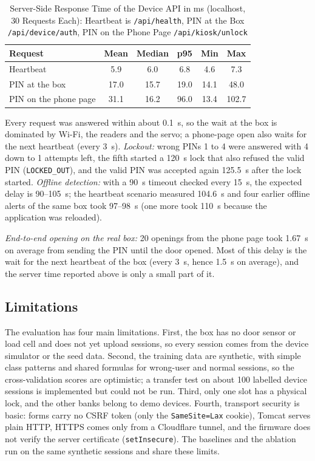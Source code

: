 \begin{table}[t]
\renewcommand{\arraystretch}{1.1}
\centering
\small
\caption{Server-Side Response Time of the Device API in ms (localhost, 30 Requests Each): Heartbeat is \texttt{/api/health}, PIN at the Box \texttt{/api/device/auth}, PIN on the Phone Page \texttt{/api/kiosk/unlock}}
\label{tab:latency}
\begin{tabular}{l c c c c c}
\toprule
Request & Mean & Median & p95 & Min & Max \\
\midrule
Heartbeat             & 5.9  & 6.0  & 6.8  & 4.6  & 7.3 \\
PIN at the box        & 17.0 & 15.7 & 19.0 & 14.1 & 48.0 \\
PIN on the phone page & 31.1 & 16.2 & 96.0 & 13.4 & 102.7 \\
\bottomrule
\end{tabular}
\end{table}

Every request was answered within about 0.1~s, so the wait at the box is dominated by Wi-Fi, the readers and the
servo; a phone-page open also waits for the next heartbeat (every 3~s). \textit{Lockout:} wrong PINs 1 to 4 were
answered with 4 down to 1 attempts left, the fifth started a 120~s lock that also refused the valid PIN
(\texttt{LOCKED\_OUT}), and the valid PIN was accepted again 125.5~s after the lock started. \textit{Offline
detection:} with a 90~s timeout checked every 15~s, the expected delay is 90--105~s; the heartbeat scenario measured
104.6~s and four earlier offline alerts of the same box took 97--98~s (one more took 110~s because the application was
reloaded).

\textit{End-to-end opening on the real box:} 20 openings from the phone page took 1.67~s on average from sending the PIN
until the door opened. Most of this delay is the wait for the next heartbeat of the box (every 3~s, hence 1.5~s on
average), and the server time reported above is only a small part of it.

\subsection{Limitations}\label{sec:limits}

The evaluation has four main limitations. First, the box has no door sensor or load cell and does not yet upload
sessions, so every session comes from the device simulator or the seed data. Second, the training data are synthetic,
with simple class patterns and shared formulas for wrong-user and normal sessions, so the cross-validation scores are
optimistic; a transfer test on about 100 labelled device sessions is implemented but could not be run. Third, only one
slot has a physical lock, and the other banks belong to demo devices. Fourth, transport security is basic: forms carry
no CSRF token (only the \texttt{SameSite=Lax} cookie), Tomcat serves plain HTTP, HTTPS comes only from a Cloudflare
tunnel, and the firmware does not verify the server certificate (\texttt{setInsecure}). The baselines and the
ablation run on the same synthetic sessions and share these limits.

